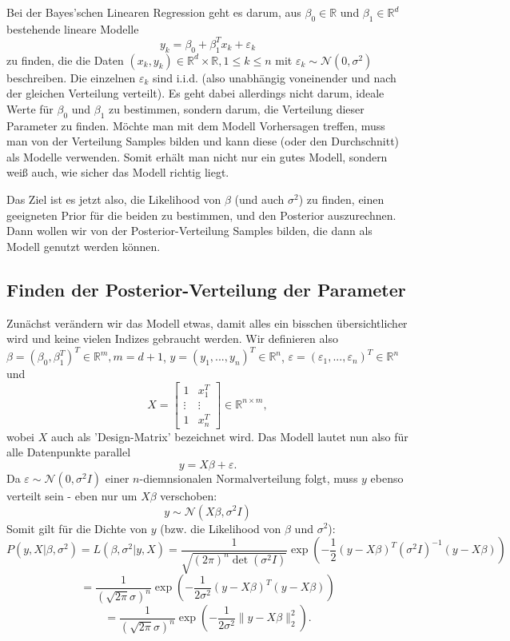 \documentclass{article}
\begin{document}
Bei der Bayes'schen Linearen Regression geht es darum, aus \(\beta_0\in\mathbb R\) und \(\beta_1\in\mathbb R^d\) bestehende lineare Modelle\[
    y_k=\beta_0+\beta_1^Tx_k+\varepsilon_k
    \]zu finden, die die Daten \((x_k,y_k)\in\mathbb R^d\times\mathbb R, 1\leq k\leq n\) mit \(\varepsilon_k\sim\mathcal N(0,\sigma^2)\) beschreiben. Die einzelnen \(\varepsilon_k\) sind i.i.d. (also unabhängig voneinender und nach der gleichen Verteilung verteilt). Es geht dabei allerdings nicht darum, ideale Werte für \(\beta_0\) und \(\beta_1\) zu bestimmen, sondern darum, die Verteilung dieser Parameter zu finden. Möchte man mit dem Modell Vorhersagen treffen, muss man von der Verteilung Samples bilden und kann diese (oder den Durchschnitt) als Modelle verwenden. Somit erhält man nicht nur ein gutes Modell, sondern weiß auch, wie sicher das Modell richtig liegt.

    Das Ziel ist es jetzt also, die Likelihood von \(\beta\) (und auch \(\sigma^2\)) zu finden, einen geeigneten Prior für die beiden zu bestimmen, und den Posterior auszurechnen. Dann wollen wir von der Posterior-Verteilung Samples bilden, die dann als Modell genutzt werden können.

\subsection{Finden der Posterior-Verteilung der Parameter}
    
    Zunächst verändern wir das Modell etwas, damit alles ein bisschen übersichtlicher wird und keine vielen Indizes gebraucht werden. Wir definieren also \(\beta=(\beta_0,\beta_1^T)^T\in\mathbb R^m,m=d+1\), \(y=(y_1,...,y_n)^T\in\mathbb R^n\), \(\varepsilon=(\varepsilon_1,...,\varepsilon_n)^T\in\mathbb R^n\) und \[
    X=\begin{bmatrix}
        1&x_1^T\\\vdots&\vdots\\1&x_n^T
    \end{bmatrix}\in\mathbb R^{n\times m},
    \]wobei \(X\) auch als 'Design-Matrix' bezeichnet wird. Das Modell lautet nun also für alle Datenpunkte parallel\[
    y=X\beta+\varepsilon.
    \] Da \(\varepsilon\sim\mathcal N(0,\sigma^2I)\) einer \(n\)-diemnsionalen Normalverteilung folgt, muss \(y\) ebenso verteilt sein - eben nur um \(X\beta\) verschoben:
    \[
    y\sim\mathcal N(X\beta,\sigma^2I)
    \]Somit gilt für die Dichte von \(y\) (bzw. die Likelihood von \(\beta\) und \(\sigma^2\)):\[
    P(y,X|\beta,\sigma^2)=L(\beta,\sigma^2|y,X)=\frac{1}{\sqrt{(2\pi)^n\det(\sigma^2I)}}\exp(-\frac12(y-X\beta)^T(\sigma^2I)^{-1}(y-X\beta))
    \]\[
    =\frac{1}{(\sqrt{2\pi}\sigma)^n}\exp(-\frac1{2\sigma^2}(y-X\beta)^T(y-X\beta))
    \]
    \[
    =\frac{1}{(\sqrt{2\pi}\sigma)^n}\exp(-\frac1{2\sigma^2}\|y-X\beta\|_2^2).
    \]
\end{document}
